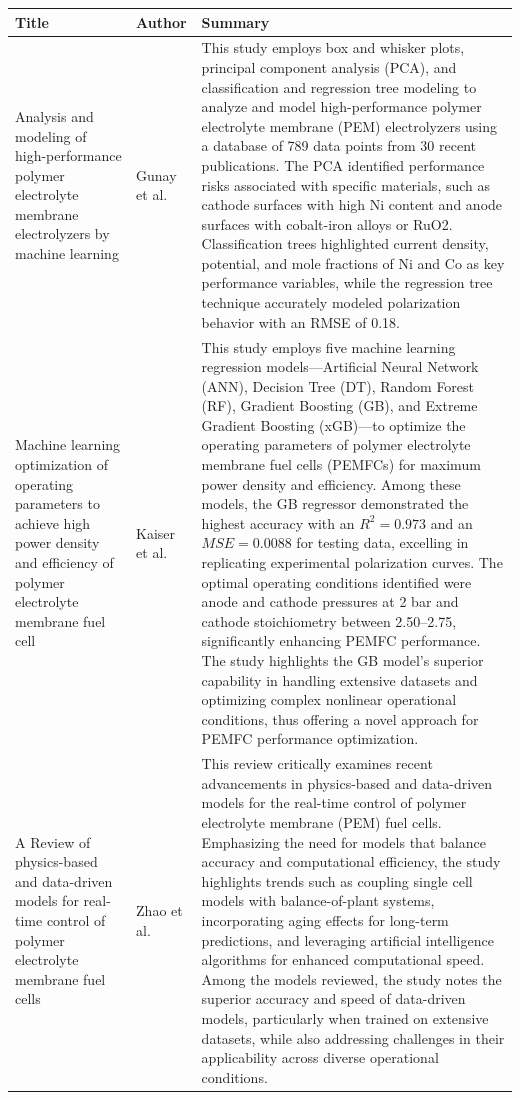     \newpage \begin{table}[H]
    \centering
    \begin{tabularx}{\textwidth}{HIJ} %
    \toprule
    \textbf{Title} & \textbf{Author} & \textbf{Summary} \\ 
    \midrule
    Analysis and modeling of high-performance polymer electrolyte membrane electrolyzers by machine learning & Gunay et al. & This study employs box and whisker plots, principal component analysis (PCA), and classification and regression tree modeling to analyze and model high-performance polymer electrolyte membrane (PEM) electrolyzers using a database of 789 data points from 30 recent publications. The PCA identified performance risks associated with specific materials, such as cathode surfaces with high Ni content and anode surfaces with cobalt-iron alloys or RuO2. Classification trees highlighted current density, potential, and mole fractions of Ni and Co as key performance variables, while the regression tree technique accurately modeled polarization behavior with an RMSE of 0.18. \\
    \midrule 
    Machine learning optimization of operating parameters to achieve high power density and efficiency of polymer electrolyte membrane fuel cell & Kaiser et al. & This study employs five machine learning regression models—Artificial Neural Network (ANN), Decision Tree (DT), Random Forest (RF), Gradient Boosting (GB), and Extreme Gradient Boosting (xGB)—to optimize the operating parameters of polymer electrolyte membrane fuel cells (PEMFCs) for maximum power density and efficiency. Among these models, the GB regressor demonstrated the highest accuracy with an \(R^2 = 0.973\) and an \(MSE = 0.0088\) for testing data, excelling in replicating experimental polarization curves. The optimal operating conditions identified were anode and cathode pressures at 2 bar and cathode stoichiometry between 2.50–2.75, significantly enhancing PEMFC performance. The study highlights the GB model's superior capability in handling extensive datasets and optimizing complex nonlinear operational conditions, thus offering a novel approach for PEMFC performance optimization. \\
    \midrule
    A Review of physics-based and data-driven models for real-time control of polymer electrolyte membrane fuel cells & Zhao et al. & This review critically examines recent advancements in physics-based and data-driven models for the real-time control of polymer electrolyte membrane (PEM) fuel cells. Emphasizing the need for models that balance accuracy and computational efficiency, the study highlights trends such as coupling single cell models with balance-of-plant systems, incorporating aging effects for long-term predictions, and leveraging artificial intelligence algorithms for enhanced computational speed. Among the models reviewed, the study notes the superior accuracy and speed of data-driven models, particularly when trained on extensive datasets, while also addressing challenges in their applicability across diverse operational conditions. \\

\end{tabularx}
\end{table}
